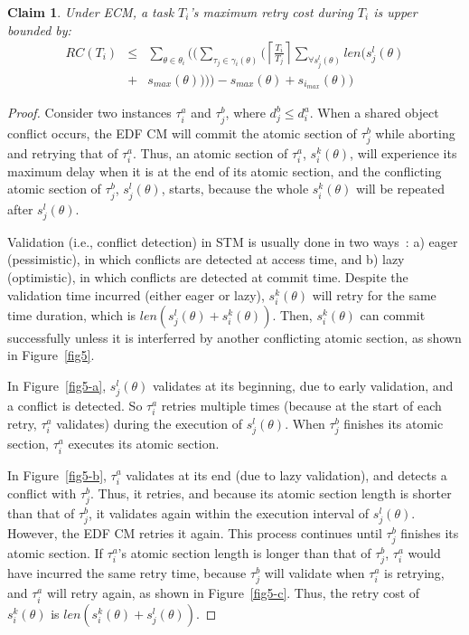 \documentclass[letter]{sig-alternate}
\newtheorem{clm}{Claim}
\begin{document}
\begin{clm}\label{gedf-edf}
Under ECM, a task $T_i$'s maximum retry cost during $T_i$ is upper bounded by:
\begin{eqnarray}
RC\left(T_{i}\right) & \le & \sum_{\theta\in\theta_{i}}\Bigg(\Big(\sum_{\tau_{j}\in\gamma_i(\theta)}\Big(\left\lceil\frac{T_{i}}{T_{j}}\right\rceil\sum_{\forall s_{j}^{l}(\theta)}len\big(s_{j}^{l}(\theta)\nonumber \\
 & + & s_{max}(\theta)\big)\Big)\Big)-s_{max}(\theta)+s_{i_{max}}(\theta)\Bigg)\label{eq3}\end{eqnarray}
\end{clm}
\begin{proof}
Consider two instances $\tau_{i}^a$ and $\tau_{j}^b$, where $d_j^b \le d_i^a$. When a shared object conflict occurs, the EDF CM will commit the atomic section of $\tau_j^b$ while aborting and retrying that of $\tau_i^a$.
Thus, an atomic section of $\tau_i^a$, $s_{i}^{k}(\theta)$,
will experience its maximum delay when it is at the end of its atomic section,  
and the conflicting atomic section of $\tau_j^b$, $s_{j}^{l}(\theta)$, starts, because the whole $s_i^k (\theta)$ will be repeated after $s_j^l (\theta)$.

Validation (i.e., conflict detection) in STM is usually done in two ways~\cite{austenmc:tcc:dissertation:2009}: a) eager (pessimistic), in which conflicts are detected at access time, and b) lazy (optimistic), in which conflicts are detected at commit time. Despite the validation time incurred (either eager or lazy),  
$s_{i}^{k}(\theta)$ will retry for the same time duration, which is $len(s_{j}^{l}(\theta)+s_i^k(\theta))$. Then, $s_i^k(\theta)$ can commit successfully  
unless it is interferred by another conflicting atomic section, as shown in Figure~\ref{fig5}. 

In Figure~\ref{fig5-a}, $s_{j}^{l}(\theta)$
validates at its beginning, due to early validation, and a conflict
is detected. So $\tau_{i}^a$ retries multiple times (because at the start of each retry, $\tau_{i}^a$ validates) 
during the execution of $s_{j}^{l}(\theta)$.
When $\tau_{j}^b$ finishes its atomic section, $\tau_{i}^a$ executes its atomic section. 

In Figure~\ref{fig5-b}, 
$\tau_{i}^a$ validates at its end (due to lazy validation), and detects a conflict with $\tau_{j}^b$.
Thus, it retries, and because its atomic section length is shorter
than that of $\tau_{j}^b$, it validates again within the execution
interval of $s_{j}^{l}(\theta)$. However, the EDF CM retries it again.
This process continues until $\tau_{j}^b$ finishes its atomic section.
If $\tau_{i}^a$'s atomic section length is longer than that of $\tau_{j}^b$,
$\tau_{i}^a$ would have incurred the same retry time, because
$\tau_{j}^b$ will validate when $\tau_{i}^a$ is retrying, and $\tau_{i}^a$ will
retry again, as shown in Figure~\ref{fig5-c}. Thus, the retry cost
of $s_{i}^{k}(\theta)$ is $len(s_{i}^{k}(\theta)+s_{j}^{l}(\theta))$.


\end{proof}
\end{document}
